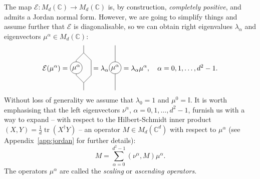 \documentclass[11pt,oneside]{amsart}
\DeclareMathOperator{\tr}{tr}
\theoremstyle{plain}%
\theoremstyle{definition}
\theoremstyle{remark}
\begin{document}
The map $\mathcal{E}\colon M_d(\mathbb{C}) \rightarrow M_d(\mathbb{C})$ is, by construction, \emph{completely positive}, and admits a Jordan normal form. However, we are going to simplify things and assume further that $\mathcal{E}$ is diagonalisable, so we can obtain right eigenvalues $\lambda_\alpha$ and eigenvectors $\mu^\alpha\in M_d(\mathbb{C})$:
\begin{equation}
	\mathcal{E}(\mu^{\alpha}) =
	\tikz[baseline=28.34pt, scale=0.75]{
      \draw (0.0, 1.0) -- (0.0, 1.1);
      \draw (0.0, 1.5) circle [radius=0.4] node {$\mu^\alpha$};
      \draw (0.0, 1.9) -- (0.0, 2.0);
      \draw (0.0, 1.0) -- (0.5, 0.5) -- (1.0, 1.0) -- (1.0, 2.0);
      \draw (0.5, 0.0) -- (0.5, 0.5);
      \draw (0.0, 2.0) -- (0.5, 2.5) -- (1.0, 2.0);
      \draw (0.5, 2.5) -- (0.5, 3.0);
    } = \lambda_\alpha \tikz[baseline=28.34pt, scale=0.75]{
      \draw (0.0, 0.0) -- (0.0, 1.1);
      \draw (0.0, 1.5) circle [radius=0.4] node {$\mu^\alpha$};
      \draw (0.0, 1.9) -- (0.0, 3.0);
    } = \lambda_\alpha \mu^\alpha, \quad \alpha = 0,1,\ldots, d^2-1.
\end{equation}
Without loss of generality we assume that $\lambda_0 = 1$ and $\mu^0 = \mathbb{I}$. It is worth emphasising that the left eigenvectors $\nu^\alpha$, $\alpha = 0, 1, \ldots, d^2-1$, furnish us with a way to expand -- with respect to the Hilbert-Schmidt inner product $(X,Y) = \frac1d\tr(X^\dag Y)$ -- an operator $M \in M_d(\mathbb{C}^d)$ with respect to $\mu^\alpha$ (see Appendix~\ref{app:jordan} for further details):
\begin{equation}
	M = \sum_{\alpha=0}^{d^2-1} (\nu^\alpha,M) \mu^\alpha.
\end{equation}
The operators $\mu^\alpha$ are called the \emph{scaling} or \emph{ascending operators}.
\end{document}
